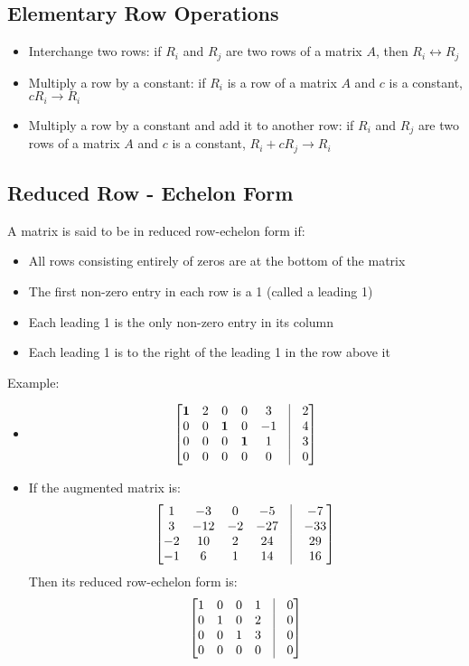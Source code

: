 \documentclass{article}
\begin{document}
\subsection*{Elementary Row Operations}
\begin{itemize}
    \item Interchange two rows: if $R_i$ and $R_j$ are two rows of a matrix $A$, then $R_i \leftrightarrow R_j$ 
    \item Multiply a row by a constant: if $R_i$ is a row of a matrix $A$ and $c$ is a constant, $cR_i \rightarrow R_i$
    \item Multiply a row by a constant and add it to another row: if $R_i$ and $R_j$ are two rows of a matrix $A$ and $c$ is a constant, $R_i + cR_j \rightarrow R_i$
\end{itemize}

\subsection*{Reduced Row - Echelon Form}
A matrix is said to be in reduced row-echelon form if:
\begin{itemize}
    \item All rows consisting entirely of zeros are at the bottom of the matrix
    \item The first non-zero entry in each row is a 1 (called a leading 1)
    \item Each leading 1 is the only non-zero entry in its column
    \item Each leading 1 is to the right of the leading 1 in the row above it
\end{itemize}
Example:
\begin{itemize}
    \item $$\begin{bmatrix}
    \textbf{1} & 2 & 0 & 0 & 3 & \vline & 2 \\
    0 & 0 & \textbf{1} & 0 & -1 & \vline & 4\\
    0 & 0 & 0 & \textbf{1} & 1 & \vline & 3 \\
    0 & 0 & 0 & 0 & 0 & \vline & 0
    \end{bmatrix}$$
    \item If the augmented matrix is: 
    $$\begin{bmatrix}
        1 & -3 & 0 & -5 & \vline & -7 \\
        3 & -12 & -2 & -27 & \vline & -33 \\
        -2 & 10 & 2 & 24 & \vline & 29 \\
        -1 & 6 & 1 & 14 & \vline & 16 \\
    \end{bmatrix}$$
    Then its reduced row-echelon form is:
    $$\begin{bmatrix}
        1 & 0 & 0 & 1 & \vline & 0 \\
        0 & 1 & 0 & 2 & \vline & 0 \\
        0 & 0 & 1 & 3 & \vline & 0 \\
        0 & 0 & 0 & 0 & \vline & 0 \\
    \end{bmatrix}$$
\end{itemize}
\end{document}
